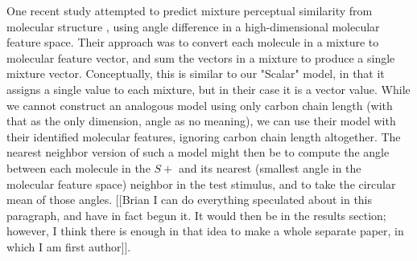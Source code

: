 One recent study attempted to predict mixture perceptual similarity from molecular structure \cite{24068899}, using angle difference in a high-dimensional molecular feature space.  Their approach was to convert each molecule in a mixture to molecular feature vector, and sum the vectors in a mixture to produce a single mixture vector.  Conceptually, this is similar to our "Scalar" model, in that it assigns a single value to each mixture, but in their case it is a vector value.  While we cannot construct an analogous model using only carbon chain length (with that as the only dimension, angle as no meaning), we can use their model with their identified molecular features, ignoring carbon chain length altogether.  The nearest neighbor version of such a model might then be to compute the angle between each molecule in the $S+$ and its nearest (smallest angle in the molecular feature space) neighbor in the test stimulus, and to take the circular mean of those angles.  [[Brian I can do everything speculated about in this paragraph, and have in fact begun it. It would then be in the results section; however, I think there is enough in that idea to make a whole separate paper, in which I am first author]].  